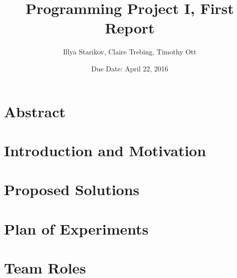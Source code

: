 \documentclass{article}
\title{Programming Project I, First Report}
\author{Illya Starikov, Claire Trebing, Timothy Ott}
\date{Due Date: April 22, 2016}
\begin{document}
\maketitle

\section{Abstract}
\section{Introduction and Motivation}
\section{Proposed Solutions}
\section{Plan of Experiments}
\section{Team Roles}
\end{document}

